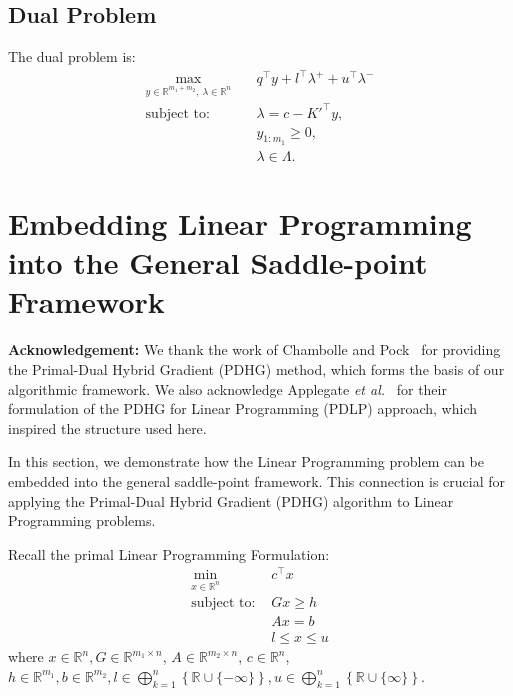 \documentclass[twoside,12pt,openright]{report}  %
\newcommand\myclearpage{\cleartooddpage
  [\thispagestyle{empty}]
  }
\DeclareMathOperator*{\proj}{\textbf{proj}}
\begin{document}
\section{Dual Problem}
The dual problem is:
\[
\begin{aligned}
\max_{y \in \mathbb{R}^{m_1+m_2},\ \lambda \in \mathbb{R}^n} \quad 
& q^\top y + l^\top \lambda^+ + u^\top \lambda^- \\
\text{subject to:} \quad 
& \lambda = c - K'^\top y, \\
& y_{1:m_1} \ge 0, \\
& \lambda \in \Lambda.
\end{aligned}
\]

\ifthenelse{\boolean{@twoside}}{\myclearpage}{}
\def\proj{\textnormal{proj}}

\chapter{Embedding Linear Programming into the General Saddle-point Framework}\label{appendixC}

\noindent\textbf{Acknowledgement:} 
We thank the work of Chambolle and Pock~\cite{chambolle2011first} for providing the Primal-Dual Hybrid Gradient (PDHG) method, which forms the basis of our algorithmic framework. 
We also acknowledge Applegate \emph{et al.}~\cite{applegate2} for their formulation of the PDHG for Linear Programming (PDLP) approach, which inspired the structure used here.

In this section, we demonstrate how the Linear Programming problem can be embedded into the general saddle-point framework. This connection is crucial for applying the Primal-Dual Hybrid Gradient (PDHG) algorithm to Linear Programming problems.



Recall the primal Linear Programming Formulation:
\[
\begin{aligned}
    \min_{x \in \mathbb{R}^n} \; &c^\top x\\
    \text{subject to: } &Gx\ge h \\
    &Ax = b\\
    &l\le x \le u
\end{aligned}
\]
where \(x \in \mathbb{R}^n,G \in \mathbb{R}^{m_1 \times n}\), \(A \in \mathbb{R}^{m_2 \times n}\), \(c \in \mathbb{R}^n\), \(h \in \mathbb{R}^{m_1}, b \in \mathbb{R}^{m_2}, l \in \displaystyle\bigoplus_{k=1}^{n}\left\{\mathbb{R} \cup \{-\infty\} \right\}, u \in \displaystyle\bigoplus_{k=1}^{n}\left\{\mathbb{R} \cup \{\infty\} \right\}  \).
\end{document}
